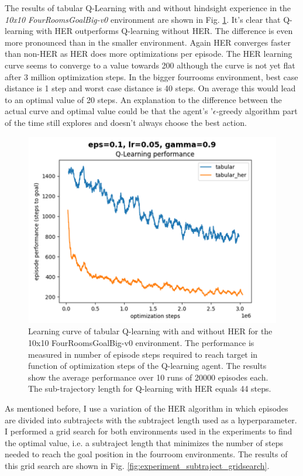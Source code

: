 \documentclass[conference]{IEEEtran}
\begin{document}
The results of tabular Q-Learning with and without hindsight experience in the \textit{10x10 FourRoomsGoalBig-v0} environment are shown in Fig. \ref{fig:experiment_fourroomsgoalbig_learning_performance}. It's clear that Q-learning with HER  outperforms Q-learning without HER. The difference is even more pronounced than in the smaller environment. Again HER converges faster than non-HER as HER does more optimizations per episode. The HER learning curve seems to converge to a value towards 200 although the curve is not yet flat after 3 million optimization steps. In the bigger fourrooms environment, best case distance is 1 step and worst case distance is 40 steps. On average this would lead to an optimal value of 20 steps. An explanation to the difference between the actual curve and optimal value could be that the agent's '$\epsilon$-greedy algorithm part of the time still explores and doesn't always choose the best action. 
\begin{figure}[ht]
\centering
\includegraphics[width=0.9\columnwidth]{img/exp_tabular_her_fourroom_big.png}
\caption{Learning curve of tabular Q-learning with and without HER for the 10x10 FourRoomsGoalBig-v0 environment. The performance is measured in number of episode steps required to reach target in function of optimization steps of the Q-learning agent. The results show the average performance over 10 runs of 20000 episodes each. The sub-trajectory length for Q-learning with HER equals 44 steps.}
\label{fig:experiment_fourroomsgoalbig_learning_performance}
\end{figure}

As mentioned before, I use a variation of the HER algorithm in which episodes are divided into subtrajects with the subtraject length used as a hyperparameter. I performed a grid search for both environments used in the experiments to find the optimal value, i.e. a subtraject length that minimizes the number of steps needed to reach the goal position in the fourroom environments. The results of this grid search are shown in Fig. \ref{fig:experiment_subtraject_gridsearch}. 
\end{document}
